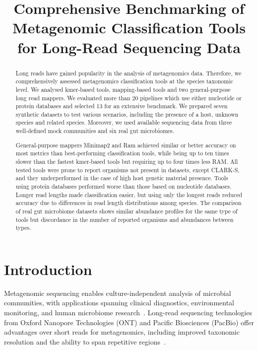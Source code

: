 \documentclass[11pt]{article}
\title{Comprehensive Benchmarking of Metagenomic Classification Tools for Long-Read Sequencing Data}
\author{}
\date{}
\begin{document}
\maketitle

\begin{abstract}
Long reads have gained popularity in the analysis of metagenomics data. Therefore, we comprehensively assessed metagenomics classification tools at the species taxonomic level. We analysed kmer-based tools, mapping-based tools and two general-purpose long read mappers. We evaluated more than 20 pipelines which use either nucleotide or protein databases and selected 13 for an extensive benchmark. We prepared seven synthetic datasets to test various scenarios, including the presence of a host, unknown species and related species. Moreover, we used available sequencing data from three well-defined mock communities and six real gut microbiomes.

General-purpose mappers Minimap2 and Ram achieved similar or better accuracy on most metrics than best-performing classification tools, while being up to ten times slower than the fastest kmer-based tools but requiring up to four times less RAM. All tested tools were prone to report organisms not present in datasets, except CLARK-S, and they underperformed in the case of high host genetic material presence. Tools using protein databases performed worse than those based on nucleotide databases. Longer read lengths made classification easier, but using only the longest reads reduced accuracy due to differences in read length distributions among species. The comparison of real gut microbiome datasets shows similar abundance profiles for the same type of tools but discordance in the number of reported organisms and abundances between types.
\end{abstract}

\section{Introduction}

Metagenomic sequencing enables culture-independent analysis of microbial communities, with applications spanning clinical diagnostics, environmental monitoring, and human microbiome research~\citep{quince2017shotgun,mcfall2013animals,turnbaugh2009microbial}. Long-read sequencing technologies from Oxford Nanopore Technologies (ONT) and Pacific Biosciences (PacBio) offer advantages over short reads for metagenomics, including improved taxonomic resolution and the ability to span repetitive regions~\citep{bertrand2019hybrid,luo2022short,xie2022finding,tedersoo2020testing,nicholls2019ultra}.
\end{document}
